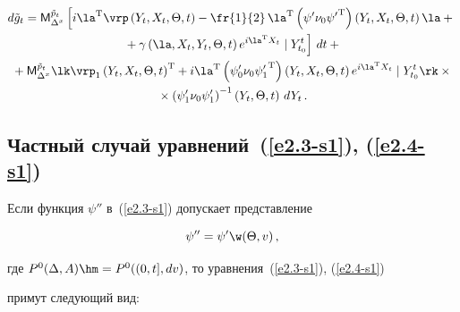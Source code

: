 \begin{multline}

d \tilde g_t ={\sf M}_{\Delta^x}^{\tilde p_t} \left[ i \la^{\mathrm{T}} \vrp 

\left(Y_t, X_t, \Theta, t\right) - \fr{1}{2}\,\la^{\mathrm{T}} 

\left(\psi' \nu_0{\psi'}^{\mathrm{T}}\right) \left(Y_t, X_t, \Theta, t\right) \la + {}\right.\\

\left.{}+

\gamma \left(\la, X_t, Y_t, \Theta, t\right) e^{i\la^{\mathrm{T}} X_t} \mid Y_{t_0}^t

\vphantom{\fr{1}{2}}\right] \,dt+{}\\

{}+{\sf M}_{\Delta^x}^{\tilde p_t} \lk  \vrp_1 

\left(Y_t, X_t, \Theta, t\right)^{\mathrm{T}} +i \la^{\mathrm{T}} 

\left(\psi_0' \nu_0{\psi_1'}^{\mathrm{T}}\right) \left(Y_t, X_t, \Theta, t\right) 

e^{i\la^{\mathrm{T}} X_t} \mid Y_{t_0}^t\rk\times{}\\

  {}\times \left(\psi_1' \nu_0\psi_1'\right)^{-1} 

  \left(Y_t, \Theta, t\right)\, d Y_t\,.\label{e2.17-s1}

  \end{multline}



\subsection{Частный случай уравнений~(\ref{e2.3-s1}), (\ref{e2.4-s1})}



Если функция  $\psi''$ в~(\ref{e2.3-s1}) допускает представление

\begin{equation}

\psi'' = \psi' \w (\Theta, v)\,,\label{e2.18-s1}

\end{equation}

где  $P^0 (\Delta, A) \hm= P^0 ((0,t], dv)$, то уравнения~(\ref{e2.3-s1}), (\ref{e2.4-s1}) 

примут следующий вид:

